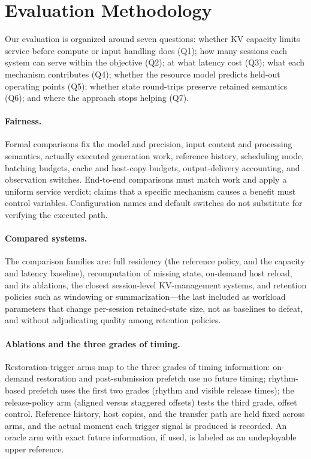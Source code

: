 \section{Evaluation Methodology}
\label{sec:methodology}


Our evaluation is organized around seven questions: whether KV capacity limits
service before compute or input handling does (Q1); how many sessions each
system can serve within the objective (Q2); at what latency cost (Q3); what
each mechanism contributes (Q4); whether the resource model predicts held-out
operating points (Q5); whether state round-trips preserve retained semantics
(Q6); and where the approach stops helping (Q7).

\paragraph{Fairness.}
Formal comparisons fix the model and precision, input content and processing
semantics, actually executed generation work, reference history, scheduling
mode, batching budgets, cache and host-copy budgets, output-delivery
accounting, and observation switches. End-to-end comparisons must match work
and apply a uniform service verdict; claims that a specific mechanism causes a
benefit must control variables. Configuration names and default switches do
not substitute for verifying the executed path.

\paragraph{Compared systems.}
The comparison families are: full residency (the reference policy, and the
capacity and latency baseline), recomputation of missing state, on-demand host
reload, \systemname and its ablations, the closest session-level KV-management
systems, and retention policies such as windowing or summarization---the last
included as workload parameters that change per-session retained-state size,
not as baselines to defeat, and without adjudicating quality among retention
policies.

\paragraph{Ablations and the three grades of timing.}
Restoration-trigger arms map to the three grades of timing information:
on-demand restoration and post-submission prefetch use no future timing;
rhythm-based prefetch uses the first two grades (rhythm and visible release
times); the release-policy arm (aligned versus staggered offsets) tests the
third grade, offset control. Reference history, host copies, and the transfer
path are held fixed across arms, and the actual moment each trigger signal is
produced is recorded. An oracle arm with exact future information, if used, is
labeled as an undeployable upper reference.


